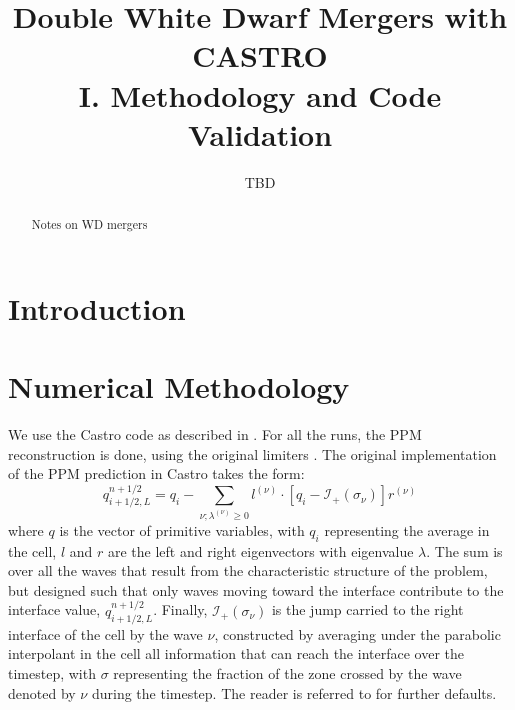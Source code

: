\documentclass[12pt,preprint]{aastex}
\begin{document}
\title{Double White Dwarf Mergers with CASTRO\\ I. Methodology and Code Validation}


\author{TBD}
\begin{abstract}
Notes on WD mergers
\end{abstract}

\section{Introduction}



\section{Numerical Methodology}\label{sec:Numerical Methodology}

We use the Castro code as described in \citet{castro}.  For all the runs,
the PPM reconstruction is done, using the original limiters \citep{ppm}.
The original implementation of the PPM prediction in Castro takes the
form:
\begin{equation}
q_{i+1/2,L}^{n+1/2} = q_i -
   \sum_{\nu;\lambda^{(\nu)}\ge 0} l^{(\nu)} \cdot \left [
        q_i - \mathcal{I}_+(\sigma_\nu)
       \right ] r^{(\nu)}
\end{equation}
where $q$ is the vector of primitive variables, with $q_i$
representing the average in the cell, $l$ and $r$ are the left and
right eigenvectors with eigenvalue $\lambda$.  The sum is over all the
waves that result from the characteristic structure of the problem,
but designed such that only waves moving toward the interface
contribute to the interface value, $q_{i+1/2,L}^{n+1/2}$.  Finally,
$\mathcal{I}_+(\sigma_\nu)$ is the jump carried to the right interface
of the cell by the wave $\nu$, constructed by averaging under the
parabolic interpolant in the cell all information that can reach the
interface over the timestep, with $\sigma$ representing the fraction
of the zone crossed by the wave denoted by $\nu$ during the timestep.
The reader is referred to \citet{ppmunsplit} for further defaults.
\end{document}
